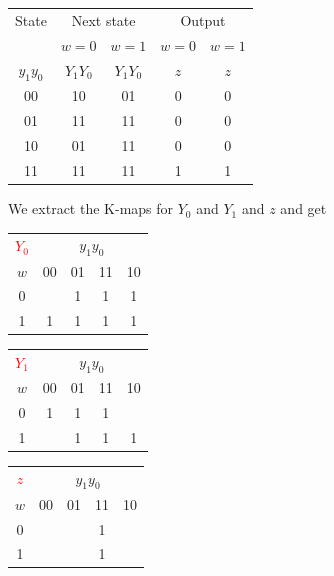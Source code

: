\documentclass[10pt,a4paper]{scrartcl}
\begin{document}
\begin{tabular}{|c||c|c||c|c|}
  \hline
 State   & \multicolumn{2}{c||}{Next state} & \multicolumn{2}{c|}{Output} \\
         & $w=0$        & $w=1$            & $w=0$       & $w=1$ \\
$y_1y_0$ & $Y_1Y_0$     & $Y_1Y_0$         & $z$         & $z$   \\ \hline\hline
00       & 10           & 01               & 0           & 0     \\ \hline  
01       & 11           & 11               & 0           & 0     \\ \hline
10       & 01           & 11               & 0           & 0     \\ \hline
11       & 11           & 11               & 1           & 1     \\ \hline
\end{tabular}

We extract the K-maps for $Y_0$ and $Y_1$ and $z$ and get

\begin{tabular}{|c||c|c|c|c|}
  \hline
\textcolor{red}{$Y_0$}    & \multicolumn{4}{c|}{$y_1y_0$} \\
$w$    & 00 & 01  & 11  & 10\\ \hline\hline
  0    &    & 1   & 1   & 1 \\ \hline
  1    & 1  & 1   & 1   & 1 \\ 
  \hline
\end{tabular}
\hspace{1cm}
\begin{tabular}{|c||c|c|c|c|}
  \hline
\textcolor{red}{$Y_1$}     & \multicolumn{4}{c|}{$y_1y_0$} \\
$w$    & 00 & 01  & 11  & 10\\ \hline\hline
  0    & 1  & 1   & 1   &   \\ \hline
  1    &    & 1   & 1   & 1 \\ 
  \hline
\end{tabular}
\hspace{1cm}
\begin{tabular}{|c||c|c|c|c|}
  \hline
\textcolor{red}{$z$}   & \multicolumn{4}{c|}{$y_1y_0$} \\
$w$    & 00 & 01  & 11  & 10\\ \hline\hline
  0    &    &     & 1   &   \\ \hline
  1    &    &     & 1   &   \\ 
  \hline
\end{tabular}
\end{document}
